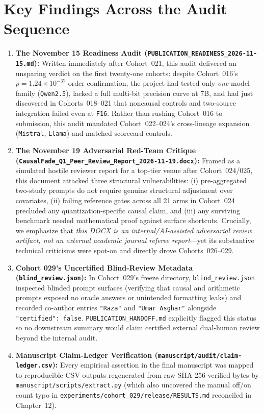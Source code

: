 \section{Key Findings Across the Audit Sequence}

\begin{enumerate}
  \item \textbf{The November 15 Readiness Audit (\texttt{PUBLICATION\_READINESS\_2026-11-15.md}):} Written immediately after Cohort~021, this audit delivered an unsparing verdict on the first twenty-one cohorts: despite Cohort~016's $p = 1.24\times 10^{-37}$ order confirmation, the project had tested only \emph{one} model family (\texttt{Qwen2.5}), lacked a full multi-bit precision curve at 7B, and had just discovered in Cohorts~018--021 that noncausal controls and two-source integration failed even at \texttt{F16}. Rather than rushing Cohort~016 to submission, this audit mandated Cohort~022--024's cross-lineage expansion (\texttt{Mistral}, \texttt{Llama}) and matched scorecard controls.
  \item \textbf{The November 19 Adversarial Red-Team Critique (\texttt{CausalFade\_Q1\_Peer\_Review\_Report\_2026-11-19.docx}):} Framed as a simulated hostile reviewer report for a top-tier venue after Cohort~024/025, this document attacked three structural vulnerabilities: (i) pre-aggregated two-study prompts do not require genuine structural adjustment over covariates, (ii) failing reference gates across all 21 arms in Cohort~024 precluded any quantization-specific causal claim, and (iii) any surviving benchmark needed mathematical proof against surface shortcuts. Crucially, we emphasize that \emph{this DOCX is an internal/AI-assisted adversarial review artifact, not an external academic journal referee report}---yet its substantive technical criticisms were spot-on and directly drove Cohorts~026--029.
  \item \textbf{Cohort 029's Uncertified Blind-Review Metadata (\texttt{blind\_review.json}):} In Cohort~029's freeze directory, \texttt{blind\_review.json} inspected blinded prompt surfaces (verifying that causal and arithmetic prompts exposed no oracle answers or unintended formatting leaks) and recorded co-author entries \texttt{"Raza"} and \texttt{"Umar Asghar"} alongside \texttt{"certified": false}. \texttt{PUBLICATION\_HANDOFF.md} explicitly flagged this status so no downstream summary would claim certified external dual-human review beyond the internal audit.
  \item \textbf{Manuscript Claim-Ledger Verification (\texttt{manuscript/audit/claim-ledger.csv}):} Every empirical assertion in the final manuscript was mapped to reproducible CSV outputs regenerated from raw SHA-256-verified bytes by \texttt{manuscript/scripts/extract.py} (which also uncovered the manual off/on count typo in \texttt{experiments/cohort\_029/release/RESULTS.md} reconciled in Chapter~12).
\end{enumerate}

